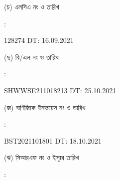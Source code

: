 \documentclass[12pt]{article}
\newcommand{\lcdt}{16.09.2021}
\newcommand{\lcano}{128274}
\newcommand{\lcadt}{{\lcdt}}
\newcommand{\invno}{BST2021101801}
\newcommand{\invdt}{18.10.2021}
\newcommand{\blno}{SHWWSE211018213}
\newcommand{\bldt}{25.10.2021}
\begin{document}
\begin{minipage}[t]{0.05\linewidth}
\hspace*{1em}
\end{minipage}
\begin{minipage}[t]{0.45\linewidth}
(চ) এলসিএ নং ও তারিখ
\end{minipage}
\begin{minipage}[t]{0.02\linewidth}
:
\end{minipage}
\begin{minipage}[t]{0.50\linewidth}
{\lcano} \hspace{2em} DT: {\lcadt}
\\
\end{minipage}
\begin{minipage}[t]{0.05\linewidth}
\hspace*{1em}
\end{minipage}
\begin{minipage}[t]{0.45\linewidth}
(ছ) বি/এল নং ও তারিখ
\end{minipage}
\begin{minipage}[t]{0.02\linewidth}
:
\end{minipage}
\begin{minipage}[t]{0.50\linewidth}
{\blno} \hspace{2em} DT: {\bldt}
\\
\end{minipage}
\begin{minipage}[t]{0.05\linewidth}
\hspace*{1em}
\end{minipage}
\begin{minipage}[t]{0.45\linewidth}
(জ) বাণিজ্যিক ইনভয়েস নং ও তারিখ
\end{minipage}
\begin{minipage}[t]{0.02\linewidth}
:
\end{minipage}
\begin{minipage}[t]{0.50\linewidth}
{\invno} \hspace{2em} DT: {\invdt}
\\
\end{minipage}
\begin{minipage}[t]{0.05\linewidth}
\hspace*{1em}
\end{minipage}
\begin{minipage}[t]{0.45\linewidth}
(ঝ) সিআরএফ নং ও ইস্যুর তারিখ
\end{minipage}
\begin{minipage}[t]{0.02\linewidth}
:
\end{minipage}
\end{document}
